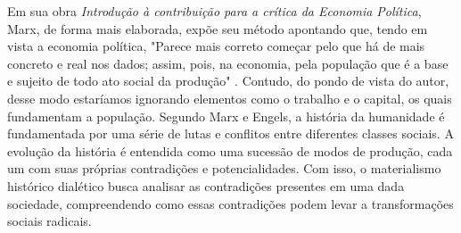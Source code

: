 \par
Em sua obra \textit{Introdução à contribuição para a crítica da Economia Política}, Marx, de forma mais elaborada, expõe seu método apontando que, tendo em vista a economia política, "Parece mais correto começar pelo que há de mais concreto e real nos dados; assim, pois, na economia, pela população que é a base e sujeito de todo ato social da produção"  \cite{ItroPolit} . Contudo, do pondo de vista do autor, desse modo estaríamos ignorando elementos como o trabalho e o capital, os quais fundamentam a população. Segundo Marx e Engels, a história da humanidade é fundamentada por uma série de lutas e conflitos entre diferentes classes sociais. A evolução da história é entendida como uma sucessão de modos de produção, cada um com suas próprias contradições e potencialidades. Com isso, o materialismo histórico dialético busca analisar as contradições presentes em uma dada sociedade, compreendendo como essas contradições podem levar a transformações sociais radicais.
\par
